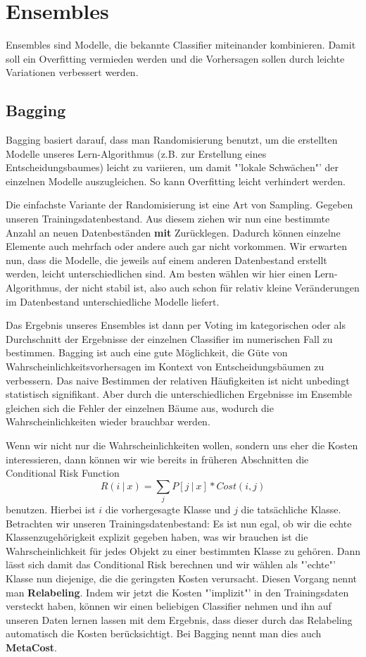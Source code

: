 \section{Ensembles}
Ensembles sind Modelle, die bekannte Classifier miteinander
kombinieren. Damit soll ein Overfitting vermieden werden
und die Vorhersagen sollen durch leichte Variationen verbessert werden.

\subsection{Bagging}
Bagging basiert darauf, dass man Randomisierung benutzt,
um die erstellten Modelle unseres Lern-Algorithmus (z.B. 
zur Erstellung eines Entscheidungsbaumes) leicht zu variieren,
um damit "'lokale Schwächen"' der einzelnen Modelle auszugleichen.
So kann Overfitting leicht verhindert werden.

Die einfachste Variante der Randomisierung ist eine Art von Sampling.
Gegeben unseren Trainingsdatenbestand. Aus diesem ziehen wir nun eine
bestimmte Anzahl an neuen Datenbeständen \textbf{mit} Zurücklegen.
Dadurch können einzelne Elemente auch mehrfach oder andere auch gar
nicht vorkommen. Wir erwarten nun, dass die Modelle, die jeweils auf einem
anderen Datenbestand erstellt werden, leicht unterschiedlichen sind. Am besten
wählen wir hier einen Lern-Algorithmus, der nicht stabil ist, also auch schon für
relativ kleine Veränderungen im Datenbestand unterschiedliche Modelle liefert.

Das Ergebnis unseres Ensembles ist dann per Voting im kategorischen
oder als Durchschnitt der Ergebnisse der einzelnen Classifier
im numerischen Fall zu bestimmen. Bagging ist auch eine gute Möglichkeit,
die Güte von Wahrscheinlichkeitsvorhersagen im Kontext von Entscheidungsbäumen
zu verbessern. Das naive Bestimmen der relativen Häufigkeiten ist nicht
unbedingt statistisch signifikant. Aber durch die unterschiedlichen Ergebnisse
im Ensemble gleichen sich die Fehler der einzelnen Bäume aus, wodurch die
Wahrscheinlichkeiten wieder brauchbar werden.

Wenn wir nicht nur die Wahrscheinlichkeiten wollen, sondern uns eher
die Kosten interessieren, dann können wir wie bereits in früheren Abschnitten
die Conditional Risk Function
\[ R(i\ |\ x) = \sum_j P[j\ |\ x] * Cost(i,j)\]
benutzen. Hierbei ist \(i\) die vorhergesagte Klasse und \(j\) die tatsächliche
Klasse. Betrachten wir unseren Trainingsdatenbestand: Es ist nun egal,
ob wir die echte Klassenzugehörigkeit explizit gegeben haben, was wir brauchen
ist die Wahrscheinlichkeit für jedes Objekt zu einer bestimmten Klasse zu gehören.
Dann lässt sich damit das Conditional Risk berechnen und wir wählen als "'echte"'
Klasse nun diejenige, die die geringsten Kosten verursacht. Diesen Vorgang nennt
man \textbf{Relabeling}. Indem wir jetzt die Kosten "'implizit"' in den 
Trainingsdaten versteckt haben, können wir einen beliebigen Classifier nehmen
und ihn auf unseren Daten lernen lassen mit dem Ergebnis, dass dieser durch das
Relabeling automatisch die Kosten berücksichtigt. Bei Bagging nennt man dies
auch \textbf{MetaCost}.

